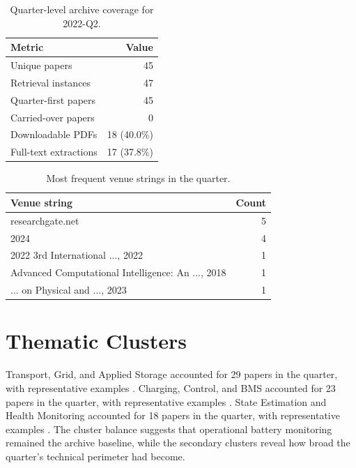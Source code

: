 \documentclass[conference]{IEEEtran}
\begin{document}
\begin{table}[t]
\caption{Quarter-level archive coverage for 2022-Q2.}
\label{tab:quarter_stats}
\centering
\footnotesize
\begin{tabular}{lr}
\toprule
Metric & Value \\
\midrule
Unique papers & 45 \\
Retrieval instances & 47 \\
Quarter-first papers & 45 \\
Carried-over papers & 0 \\
Downloadable PDFs & 18 (40.0\%) \\
Full-text extractions & 17 (37.8\%) \\
\bottomrule
\end{tabular}
\end{table}

\begin{table}[t]
\caption{Most frequent venue strings in the quarter.}
\label{tab:venues}
\centering
\footnotesize
\begin{tabularx}{\linewidth}{Xr}
\toprule
Venue string & Count \\
\midrule
researchgate.net & 5 \\
2024 & 4 \\
2022 3rd International ..., 2022 & 1 \\
Advanced Computational Intelligence: An ..., 2018 & 1 \\
... on Physical and ..., 2023 & 1 \\
\bottomrule
\end{tabularx}
\end{table}

\section{Thematic Clusters}
Transport, Grid, and Applied Storage accounted for 29 papers in the quarter, with representative examples \cite{machinelearningdriven2025,socestimationof2023}. Charging, Control, and BMS accounted for 23 papers in the quarter, with representative examples \cite{machinelearningdriven2025,socestimationof2023}. State Estimation and Health Monitoring accounted for 18 papers in the quarter, with representative examples \cite{socestimationof2023,participationofbattery2020}. The cluster balance suggests that operational battery monitoring remained the archive baseline, while the secondary clusters reveal how broad the quarter's technical perimeter had become.
\end{document}

